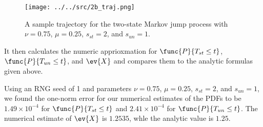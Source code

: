 \begin{enumerate}[a)]
\begin{figure}[H]
	\centering
	\texttt{[image: ../../src/2b\_traj.png]}
	\caption{A sample trajectory for the two-state Markov jump process with $\nu = 0.75$, $\mu = 0.25$, $s_{st} = 2$, and $s_{un} = 1$.}
	\label{fig:traj_2}
\end{figure}

It then calculates the numeric apprioxmation for $\func{P}{T_{st} \leq t}$, $\func{P}{T_{un} \leq t}$, and $\ev{X}$ and compares them to the analytic formulas given above. 

Using an RNG seed of 1 and parameters $\nu = 0.75$, $\mu = 0.25$, $s_{st} = 2$, and $s_{un} = 1$, we found the one-norm error for our numerical estimates of the PDFs to be $1.49 \times 10^{-4}$ for $\func{P}{T_{st} \leq t}$ and $2.41 \times 10^{-4}$ for $\func{P}{T_{un} \leq t}$. The numerical estimate of $\ev{X}$ is $1.2535$, whle the analytic value is $1.25$.
\end{enumerate}
